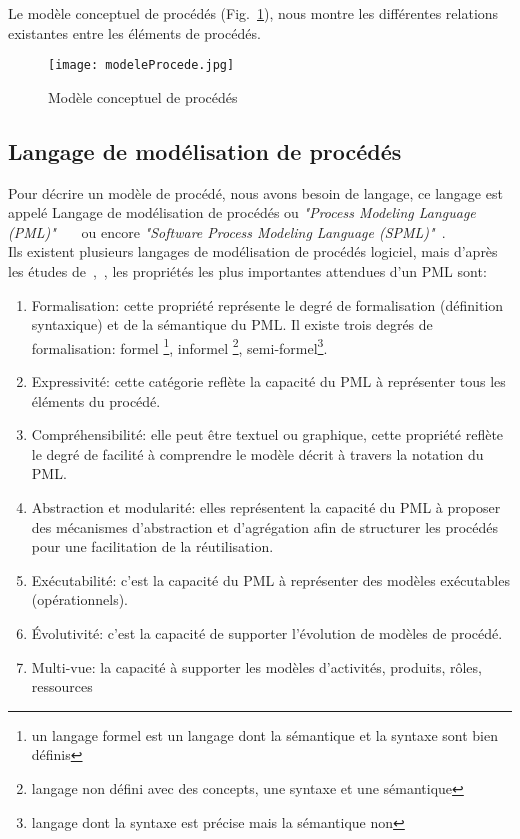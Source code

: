 \clearpage
Le modèle conceptuel de procédés (Fig.~\ref{mcp}), nous montre les différentes relations existantes entre les éléments de procédés.
\begin{figure}[h]
\centering
\texttt{[image: modeleProcede.jpg]}
\caption{\label{mcp}Modèle conceptuel de procédés~\cite{hnt10}}
\end{figure}
\subsection{Langage de modélisation de procédés }
Pour décrire un modèle de procédé, nous avons besoin de langage, ce langage est appelé \og Langage de modélisation de procédés \fg{} ou \textit{"Process Modeling Language (PML)"}~\cite{ac}~\cite{rc}~\cite{sl} ou encore \textit{"Software Process Modeling Language (SPML)"}~\cite{alm}. \\
Ils existent plusieurs langages de modélisation de procédés logiciel, mais d'après les études de~\cite{abgm},\cite{vra}~\cite{jab}, les propriétés les plus importantes attendues d'un PML sont:
\begin{enumerate}
\item Formalisation: cette propriété représente le degré de formalisation (définition syntaxique) et de la sémantique du PML. Il existe trois degrés de formalisation: formel \footnote{un langage formel est un langage dont la sémantique et la syntaxe sont bien définis}, informel \footnote{langage non défini avec des concepts, une syntaxe et une sémantique}, semi-formel\footnote{langage dont la syntaxe est précise mais la sémantique non}.
\item Expressivité: cette catégorie reflète la capacité du PML à représenter tous les éléments du procédé.
\item Compréhensibilité: elle peut être textuel ou graphique, cette propriété reflète le degré de facilité à comprendre le modèle décrit à travers la notation du PML.
\item Abstraction et modularité: elles représentent la capacité du PML à proposer des mécanismes d'abstraction et d'agrégation afin de structurer les procédés pour une facilitation de la réutilisation.
\item Exécutabilité: c'est la capacité du PML à représenter des modèles exécutables (opérationnels). 
\item Évolutivité: c'est la capacité de supporter l'évolution de modèles de procédé. 
\item Multi-vue: la capacité à supporter les modèles d'activités, produits, rôles, ressources 
\end{enumerate}
